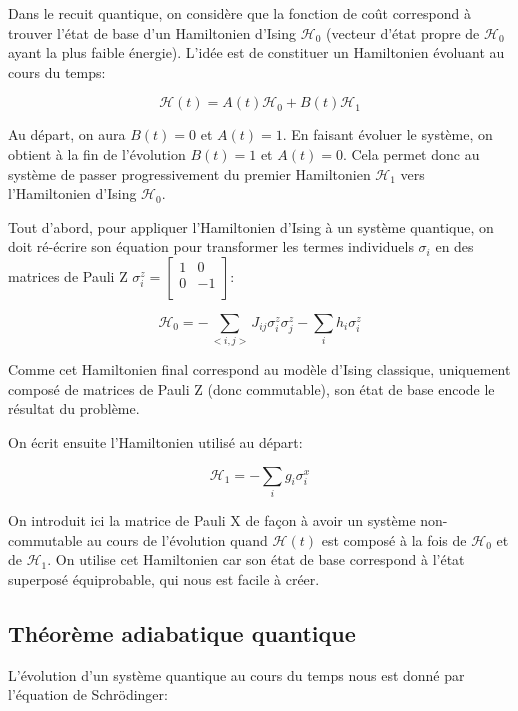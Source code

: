 \documentclass[12pt,a4paper]{article}
\begin{document}
Dans le recuit quantique, on considère que la fonction de coût correspond à trouver l'état de base d'un Hamiltonien d'Ising $\mathcal{H}_0$ (vecteur d'état propre de $\mathcal{H}_0$ ayant la plus faible énergie). L'idée est de constituer un Hamiltonien évoluant au cours du temps:

\begin{equation}
    \mathcal{H}(t) = A(t) \mathcal{H}_0 + B(t) \mathcal{H}_1
\end{equation}

Au départ, on aura $B(t) = 0$ et $A(t) = 1$. En faisant évoluer le système, on obtient à la fin de l'évolution $B(t) = 1$ et $A(t) = 0$. Cela permet donc au système de passer progressivement du premier Hamiltonien $\mathcal{H}_1$ vers l'Hamiltonien d'Ising $\mathcal{H}_0$.

Tout d'abord, pour appliquer l'Hamiltonien d'Ising à un système quantique, on doit ré-écrire son équation pour transformer les termes individuels $\sigma_i$ en des matrices de Pauli Z $\sigma_i^z = \begin{bmatrix} 1 & 0 \\ 0 & -1 \\ \end{bmatrix}$:

\begin{equation}
    \mathcal{H}_0 = -\displaystyle\sum_{<i, j>} J_{ij} \sigma_i^z \sigma_j^z - \displaystyle\sum_{i} h_i \sigma_i^z
\end{equation}

Comme cet Hamiltonien final correspond au modèle d'Ising classique, uniquement composé de matrices de Pauli Z (donc commutable), son état de base encode le résultat du problème.

\medbreak

On écrit ensuite l'Hamiltonien utilisé au départ:

\begin{equation}
    \mathcal{H}_1 = - \displaystyle\sum_{i} g_i \sigma_i^x
\end{equation}

On introduit ici la matrice de Pauli X de façon à avoir un système non-commutable au cours de l'évolution quand $\mathcal{H}(t)$ est composé à la fois de $\mathcal{H}_0$ et de $\mathcal{H}_1$. On utilise cet Hamiltonien car son état de base correspond à l'état superposé équiprobable, qui nous est facile à créer.

\subsection*{Théorème adiabatique quantique}
L'évolution d'un système quantique au cours du temps nous est donné par l'équation de Schrödinger:
\end{document}
